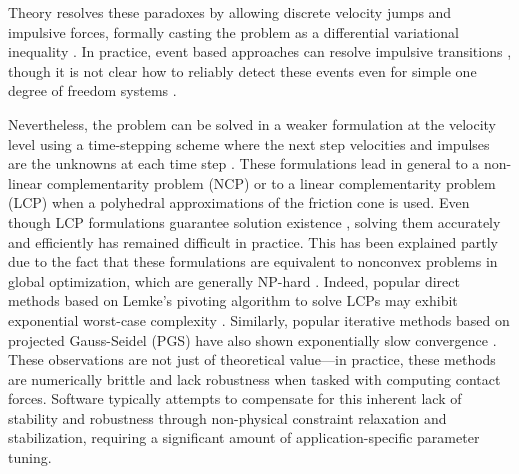 %
Theory resolves these paradoxes by allowing discrete velocity jumps and
impulsive forces, formally casting the problem as a differential variational
inequality \cite{bib:pang2008differential}. In practice, event based approaches
can resolve impulsive transitions \cite{bib:haug1986}, though it is not clear
how to reliably detect these events even for simple one degree of freedom
systems \cite{bib:hogan2017regularization}.

Nevertheless, the problem can be solved in a weaker formulation at the velocity
level using a time-stepping scheme where the next step velocities and impulses
are the unknowns at each time step \cite{bib:stewart1996implicit,
bib:anitescu1997}. These formulations lead in general to a non-linear
complementarity problem (NCP) or to a linear complementarity problem (LCP) when
a polyhedral approximations of the friction cone is used. Even though LCP
formulations guarantee solution existence \cite{bib:anitescu1997,
bib:stewart1998convergence}, solving them accurately and efficiently has
remained difficult in practice. This has been explained partly due to the fact
that these formulations are equivalent to nonconvex problems in global
optimization, which are generally NP-hard \cite{bib:Kaufman2008}. Indeed,
popular direct methods based on Lemke's pivoting algorithm to solve LCPs may
exhibit exponential worst-case complexity \cite{bib:baraff1994fast}. Similarly,
popular iterative methods based on projected Gauss-Seidel (PGS)
\cite{bib:duriez2006_realistic_haptic_rendering, bib:bullet} have also shown
exponentially slow convergence \cite{bib:erleben2007velocity}. These
observations are not just of theoretical value---in practice, these methods are
numerically brittle and lack robustness when tasked with computing contact
forces. Software typically attempts to compensate for this inherent lack of
stability and robustness through non-physical constraint relaxation and
stabilization, requiring a significant amount of application-specific parameter
tuning.

